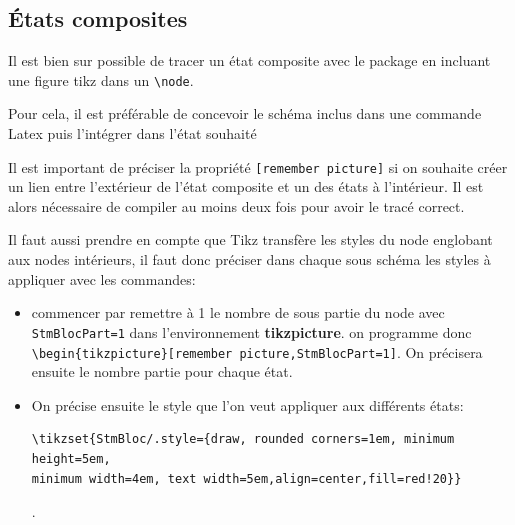 \documentclass[a4paper,11pt]{article}                      %
\begin{document}
\subsection{États composites}

Il est bien sur possible de tracer un  état composite avec le package  en incluant une figure tikz dans un \verb!\node!.

Pour cela, il est préférable de concevoir le schéma inclus dans une commande Latex puis l'intégrer dans l'état souhaité

Il est important de préciser la propriété \verb![remember picture]!  si on souhaite créer un lien entre l'extérieur de l'état composite et un des états à l'intérieur. Il est alors nécessaire de compiler au moins deux fois pour avoir le tracé correct.

Il faut aussi prendre en compte que Tikz  transfère les styles du node englobant aux nodes  intérieurs, il faut donc  préciser dans chaque sous schéma  les styles à appliquer  avec les commandes:

\begin{itemize}
\item commencer par remettre à 1 le nombre de sous partie du node avec  \verb!StmBlocPart=1!   dans l'environnement \textbf{tikzpicture}. on programme donc \verb!\begin{tikzpicture}[remember picture,StmBlocPart=1]!.  On précisera ensuite le nombre partie pour chaque état.
\item On précise ensuite le style que l'on veut appliquer aux différents états:
\begin{verbatim}\tikzset{StmBloc/.style={draw, rounded corners=1em, minimum height=5em, 
minimum width=4em, text width=5em,align=center,fill=red!20}} \end{verbatim}.

\end{itemize}
\end{document}

